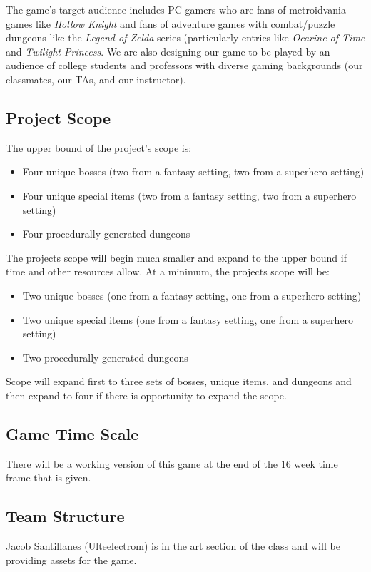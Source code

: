 \documentclass[titlepage]{article}
\begin{document}
The game's target audience includes PC gamers who are fans of metroidvania
games like  \textit{Hollow Knight} and fans of adventure games with
combat/puzzle dungeons like the \textit{Legend of Zelda} series (particularly
entries like \textit{Ocarine of Time} and \textit{Twilight Princess}. We are
also designing our game to be played by an audience of college students and
professors with diverse gaming backgrounds (our classmates, our TAs, and our
instructor).

\subsection*{Project Scope}
The upper bound of the project's scope is:
\begin{itemize}
    \item Four unique bosses (two from a fantasy setting, two from a superhero setting)
    \item Four unique special items (two from a fantasy setting, two from a superhero setting)
    \item Four procedurally generated dungeons
\end{itemize}

The projects scope will begin much smaller and expand to the upper bound if time
and other resources allow. At a minimum, the projects scope will be:
\begin{itemize}
    \item Two unique bosses (one from a fantasy setting, one from a superhero setting)
    \item Two unique special items (one from a fantasy setting, one from a superhero setting)
    \item Two procedurally generated dungeons
\end{itemize}

Scope will expand first to three sets of bosses, unique items, and dungeons and
then expand to four if there is opportunity to expand the scope.

\subsection*{Game Time Scale}
There will be a working version of this game at the end of the 16 week time 
frame that is given.

\subsection*{Team Structure}
Jacob Santillanes (Ulteelectrom) is in the art section of the class and will be 
providing assets for the game. \\
\end{document}
